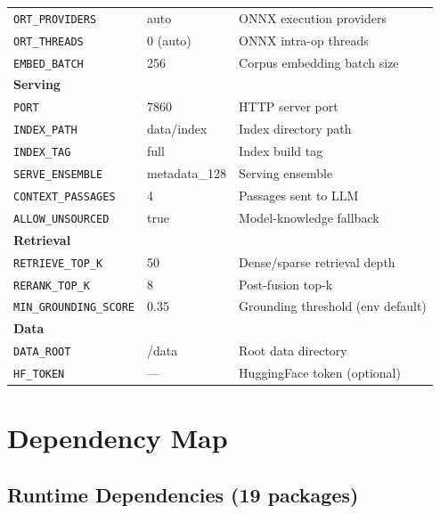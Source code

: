 \documentclass[12pt,a4paper]{article}
\begin{document}
\begin{longtable}{llp{7cm}}
\texttt{ORT\_PROVIDERS}     & auto & ONNX execution providers \\
\texttt{ORT\_THREADS}       & 0 (auto) & ONNX intra-op threads \\
\texttt{EMBED\_BATCH}       & 256 & Corpus embedding batch size \\
\midrule
\multicolumn{3}{l}{\textbf{Serving}} \\
\texttt{PORT}               & 7860 & HTTP server port \\
\texttt{INDEX\_PATH}        & data/index & Index directory path \\
\texttt{INDEX\_TAG}         & full & Index build tag \\
\texttt{SERVE\_ENSEMBLE}    & metadata\_128 & Serving ensemble \\
\texttt{CONTEXT\_PASSAGES}  & 4 & Passages sent to LLM \\
\texttt{ALLOW\_UNSOURCED}   & true & Model-knowledge fallback \\
\midrule
\multicolumn{3}{l}{\textbf{Retrieval}} \\
\texttt{RETRIEVE\_TOP\_K}   & 50 & Dense/sparse retrieval depth \\
\texttt{RERANK\_TOP\_K}     & 8 & Post-fusion top-k \\
\texttt{MIN\_GROUNDING\_SCORE} & 0.35 & Grounding threshold (env default) \\
\midrule
\multicolumn{3}{l}{\textbf{Data}} \\
\texttt{DATA\_ROOT}         & /data & Root data directory \\
\texttt{HF\_TOKEN}          & --- & HuggingFace token (optional) \\
\end{longtable}


\section{Dependency Map}

\subsection{Runtime Dependencies (19 packages)}
\end{document}
